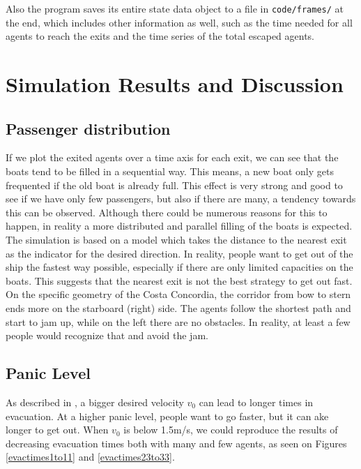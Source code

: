 \documentclass[11pt]{article}
\begin{document}
Also the program saves its entire state data object to a file in
\texttt{code/frames/} at the end, which includes other information as well,
such as the time needed for all agents to reach the exits and the time series
of the total escaped agents.

\section{Simulation Results and Discussion}

\subsection{Passenger distribution} %

If we plot the exited agents over a time axis for each exit, we can see that
the boats tend to be filled in a sequential way.  This means, a new boat only
gets frequented if the old boat is already full.  This effect is very strong
and good to see if we have only few passengers, but also if there are many, a
tendency towards this can be observed.  Although there could be numerous
reasons for this to happen, in reality a more distributed and parallel filling
of the boats is expected.  The simulation is based on a model which takes the
distance to the nearest exit as the indicator for the desired direction.  In
reality, people want to get out of the ship the fastest way possible,
especially if there are only limited capacities on the boats.  This suggests
that the nearest exit is not the best strategy to get out fast.  On the
specific geometry of the Costa Concordia, the corridor from bow to stern ends
more on the starboard (right) side.  The agents follow the shortest path and
start to jam up, while on the left there are no obstacles.  In reality, at
least a few people would recognize that and avoid the jam.

\subsection{Panic Level} %
As described in \cite{helbing}, a bigger desired velocity \(v_0\) 
can lead to longer times in evacuation.
At a higher panic level, people want to go faster, but it can ake longer to get out.
When \(v_0\) is below 1.5m/s, we could reproduce the results of decreasing evacuation times
both with many and few agents, as seen on Figures \ref{evactimes1to11} and \ref{evactimes23to33}.
\end{document}
